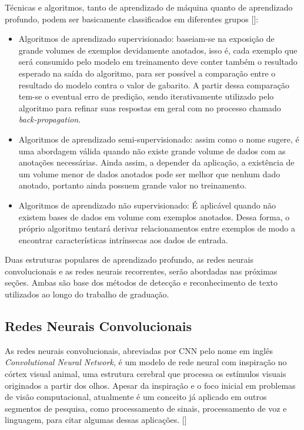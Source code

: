Técnicas e algoritmos, tanto de aprendizado de máquina quanto de aprendizado profundo, podem ser basicamente classificados 
em diferentes grupos []:

\begin{itemize}
    \item Algoritmos de aprendizado supervisionado: baseiam-se na exposição de grande volumes de exemplos devidamente anotados, 
    isso é, cada exemplo que será consumido pelo modelo em treinamento deve conter também o resultado esperado na saída do algoritmo, 
    para ser possível a comparação entre o resultado do modelo contra o valor de gabarito. A partir dessa comparação tem-se o eventual 
    erro de predição, sendo iterativamente utilizado pelo algoritmo para refinar suas respostas em geral com no processo chamado \textit{back-propagation}.

    \item Algoritmos de aprendizado semi-supervisionado: assim como o nome sugere, é uma abordagem válida quando não existe grande 
    volume de dados com as anotações necessárias. Ainda assim, a depender da aplicação, a existência de um volume menor de dados 
    anotados pode ser melhor que nenhum dado anotado, portanto ainda possuem grande valor no treinamento.

    \item Algoritmos de aprendizado não supervisionado: É aplicável quando não existem bases de dados em volume com exemplos anotados. 
    Dessa forma, o próprio algoritmo tentará derivar relacionamentos entre exemplos de modo a encontrar características intrínsecas aos dados de entrada.
\end{itemize}

Duas estruturas populares de aprendizado profundo, as redes neurais convolucionais e as redes neurais recorrentes, serão 
abordadas nas próximas seções. Ambas são base dos métodos de detecção e reconhecimento de texto utilizados ao longo do trabalho de graduação.


\subsection{Redes Neurais Convolucionais}
As redes neurais convolucionais, abreviadas por CNN pelo nome em inglês \textit{Convolutional Neural Network}, é um modelo de rede neural 
com inspiração no córtex visual animal, uma estrutura cerebral que processa os estímulos visuais originados a partir dos olhos. Apesar da 
inspiração e o foco inicial em problemas de visão computacional, atualmente é um conceito já aplicado em outros segmentos de pesquisa, 
como processamento de sinais, processamento de voz e linguagem, para citar algumas dessas aplicações. []

